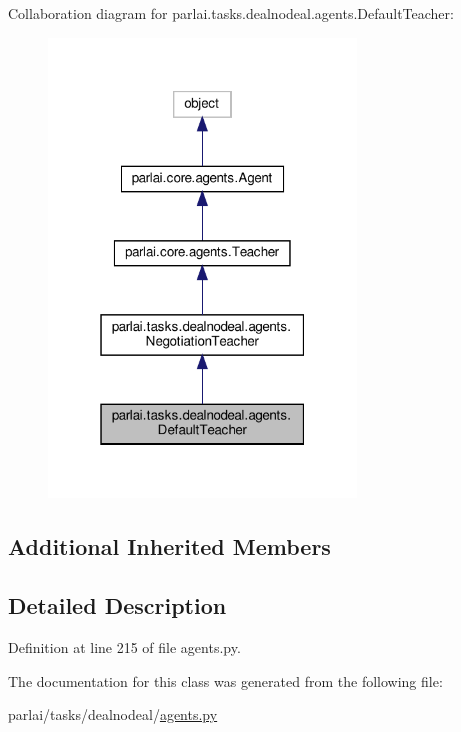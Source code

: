 Collaboration diagram for parlai.\+tasks.\+dealnodeal.\+agents.\+Default\+Teacher\+:\nopagebreak
\begin{figure}[H]
\begin{center}
\leavevmode
\includegraphics[width=232pt]{de/d98/classparlai_1_1tasks_1_1dealnodeal_1_1agents_1_1DefaultTeacher__coll__graph}
\end{center}
\end{figure}
\subsection*{Additional Inherited Members}


\subsection{Detailed Description}


Definition at line 215 of file agents.\+py.



The documentation for this class was generated from the following file\+:\begin{DoxyCompactItemize}
\item 
parlai/tasks/dealnodeal/\hyperlink{parlai_2tasks_2dealnodeal_2agents_8py}{agents.\+py}\end{DoxyCompactItemize}
